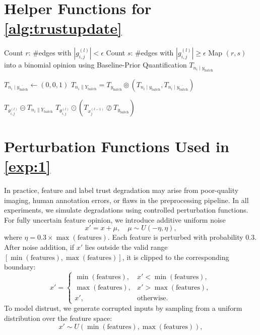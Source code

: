 \section{Helper Functions for \cref{alg:trustupdate}}\label{app:algorithm}
\begin{algorithm}[H]
\caption{Helper functions used by the Parameter-Trust Update}
\begin{algorithmic}[1]
        \State Count $r$: \#edges with $|g^{(l)}_{i,j}| < \epsilon$ 
        \State Count $s$: \#edges with $|g^{(l)}_{i,j}| \geq \epsilon$ 
        \State Map $(r,s)$ into a binomial opinion using Baseline-Prior Quantification
        \State \Return $T_{n_i \mid y_\text{batch}}$
    \EndFunction

        \State $T_{n_i \mid \overline{y_\text{batch}}}  \longleftarrow  (0,0,1)$
        \State \Return $T_{n_i \parallel Y_\text{batch}} = T_{y_\text{batch}} \circledcirc (T_{n_i \mid y_\text{batch}}, T_{n_i \mid \overline{y_\text{batch}}})$
    \EndFunction

        \State \Return $T_{\theta_{i,j}^{(l)}} \circleddash T_{n_i \parallel Y_\text{batch}}$
    \EndFunction
    \State \Return $T_{\theta^{(l)}_{i,j}} \odot 
           (T_{x^{(l-1)}_j} \oslash T_{y_\text{batch}})$
    \EndFunction

\end{algorithmic}
\end{algorithm}

\section{Perturbation Functions Used in \cref{exp:1}}\label{app:perturb}
In practice, feature and label trust degradation may arise from poor-quality imaging, human annotation errors, or flaws in the preprocessing pipeline. 
In all experiments, we simulate degradations using controlled perturbation functions. 
For fully uncertain feature opinion, we introduce additive uniform noise 
\vspace{-1em}
\[
x' = x + \mu, \quad \mu \sim U(-\eta, \eta),
\]
where 
\(
\eta = 0.3 \times \max(\text{features}).
\)
Each feature is perturbed with probability $0.3$. 
After noise addition, if $x'$ lies outside the valid range 
$[\min(\text{features}), \max(\text{features})]$, it is clipped to the corresponding boundary:
\[
x' = 
\begin{cases}
\min(\text{features}), & x' < \min(\text{features}), \\
\max(\text{features}), & x' > \max(\text{features}), \\
x', & \text{otherwise}.
\end{cases}
\]
To model distrust, we generate corrupted inputs by sampling from a uniform distribution over the feature space:
\[
x' \sim U(\min(\text{features}), \max(\text{features})),
\]

